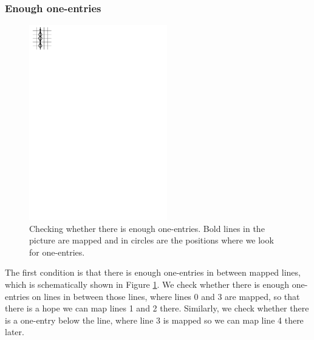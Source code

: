\subsubsection{Enough one-entries}
\begin{figure}[h!]
\centering
\includegraphics[width=60mm]{../img/enough_one-entries.pdf}
\caption{Checking whether there is enough one-entries. Bold lines in the picture are mapped and in circles are the positions where we look for one-entries.}
\label{enough}
\end{figure}
The first condition is that there is enough one-entries in between mapped lines, which is schematically shown in Figure \ref{enough}. We check whether there is enough one-entries on lines in between those lines, where lines 0 and 3 are mapped, so that there is a hope we can map lines 1 and 2 there. Similarly, we check whether there is a one-entry below the line, where line 3 is mapped so we can map line 4 there later.
